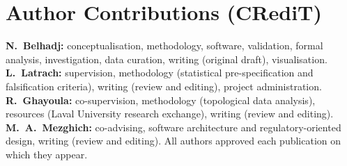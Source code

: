 \section*{Author Contributions (CRediT)}

\textbf{N.~Belhadj:} conceptualisation, methodology, software, validation, formal analysis,
investigation, data curation, writing (original draft), visualisation.
\textbf{L.~Latrach:} supervision, methodology (statistical pre-specification and
falsification criteria), writing (review and editing), project administration.
\textbf{R.~Ghayoula:} co-supervision, methodology (topological data analysis), resources
(Laval University research exchange), writing (review and editing).
\textbf{M.~A.~Mezghich:} co-advising, software architecture and regulatory-oriented design,
writing (review and editing). All authors approved each publication on which they appear.
